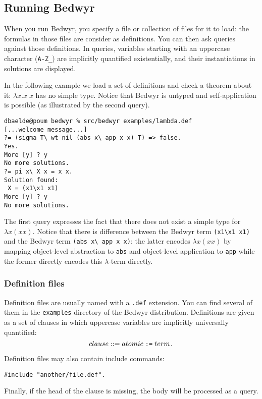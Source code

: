\documentclass{article}
\begin{document}
\subsection{Running Bedwyr}

When you run Bedwyr, you specify a file or collection of files for it
to load: the formulas in those files are consider as definitions.  You
can then ask queries against those definitions.
In queries, variables starting with an uppercase character (\verb.A-Z_.)
are implicitly quantified existentially, and their instantiations in solutions
are displayed.

In the following example we load a set of definitions and check a
theorem about it: $\lambda x.x\;x$ has no simple type.  Notice that
Bedwyr is untyped and self-application is possible (as illustrated by
the second query).

\begin{verbatim}
dbaelde@poum bedwyr % src/bedwyr examples/lambda.def
[...welcome message...]
?= (sigma T\ wt nil (abs x\ app x x) T) => false.
Yes.
More [y] ? y
No more solutions.
?= pi x\ X x = x x.
Solution found:
 X = (x1\x1 x1)
More [y] ? y
No more solutions.
\end{verbatim}
The first query expresses the fact that there does not exist a simple
type for $\lambda x (x x)$.  Notice that there is difference between
the Bedwyr term \verb+(x1\x1 x1)+ and the Bedwyr term
\verb+(abs x\ app x x)+: the latter encodes $\lambda x (x x)$ by
mapping object-level abstraction to {\tt abs} and object-level
application to {\tt app} while the former directly encodes this
$\lambda$-term directly.


\subsubsection{Definition files}

Definition files are usually named with a \verb|.def| extension.
You can find several of them in the \verb.examples. directory
of the Bedwyr distribution.
Definitions are given as a set of clauses in which uppercase
variables are implicitly universally quantified:
\[ clause ::= atomic \;\verb.:=.\; term \verb|.| \]

Definition files may also contain include commands:
\begin{verbatim}#include "another/file.def".\end{verbatim}

Finally, if the head of the clause is missing, the body will be processed as a 
query.
\end{document}
